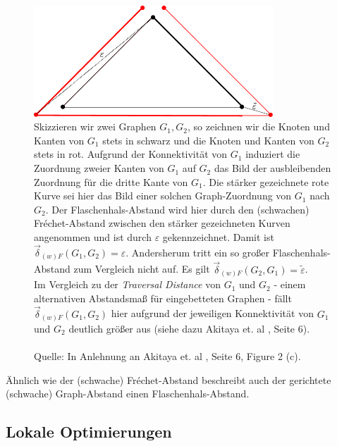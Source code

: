 \documentclass[a4paper, 12pt, twoside]{article}
\theoremstyle{Format1} %
\begin{document}
\begin{figure}[H]
    \centering
    \includegraphics[width=0.8\textwidth]{chapter_2_example_1.pdf}
    \caption{
	    Skizzieren wir zwei Graphen $G_1,G_2$, so zeichnen wir die Knoten und Kanten von $G_1$ stets in schwarz und die Knoten und Kanten von $G_2$ stets in rot.
	    Aufgrund der Konnektivität von $G_1$ induziert die Zuordnung zweier Kanten von $G_1$ auf $G_2$ das Bild der ausbleibenden Zuordnung für die dritte Kante von $G_1$.
	    Die stärker gezeichnete rote Kurve sei hier das Bild einer solchen Graph-Zuordnung von $G_1$ nach $G_2$.
	    Der Flaschenhals-Abstand wird hier durch den (schwachen) Fréchet-Abstand zwischen den stärker gezeichneten Kurven angenommen und ist durch $\varepsilon$ gekennzeichnet.
	    Damit ist $\vec{\delta}_{(w)F}(G_1,G_2) = \varepsilon$.
	    Andersherum tritt ein so großer Flaschenhals-Abstand zum Vergleich nicht auf. Es gilt $\vec{\delta}_{(w)F}(G_2,G_1) = \tilde{\varepsilon}$.
	    \\
	    Im Vergleich zu der \textit{Traversal Distance} von $G_1$ und $G_2$ - einem alternativen Abstandsmaß für eingebetteten Graphen - fällt $\vec{\delta}_{(w)F}(G_1,G_2)$ hier
	    aufgrund der jeweiligen Konnektivität von $G_1$ und $G_2$ deutlich größer aus (siehe dazu Akitaya et. al \cite{Akitaya}, Seite 6).
	    \\
	    \\
	    Quelle: In Anlehnung an Akitaya et. al \cite{Akitaya}, Seite 6, Figure 2 (c).
    }
    \label{chapter_2_example_1}
\end{figure}

Ähnlich wie der (schwache) Fréchet-Abstand beschreibt auch der gerichtete (schwache) Graph-Abstand einen Flaschenhals-Abstand.

\subsection{Lokale Optimierungen}
\end{document}
